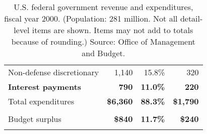 \begin{table}
\begin{center}
\begin{tabular}{lrrr}
\hspace{.4cm} Non-defense discretionary & 1,140 & 15.8\% & 320 \\ %
\hspace{.1cm} \bf\small Interest payments & \bf\small 790 & \bf\small 11.0\% & \bf\small 220 \\
\sc Total expenditures & \bf \$6,360 & \bf 88.3\% & \bf \$1,790 \\ %
& & & \\ %
\sc Budget surplus & \bf \$840 & \bf 11.7\% & \bf \$240 \\ %
& & & \\ %
\end{tabular}
\caption[U.S. federal government budget, fiscal year 2000.]{U.S. federal government revenue and expenditures, fiscal year 2000. (Population: 281 million. Not all detail-level items are shown. Items may not add to totals because of rounding.) Source: Office of Management and Budget.}
\label{federalbudget}
\end{center}
\end{table}







